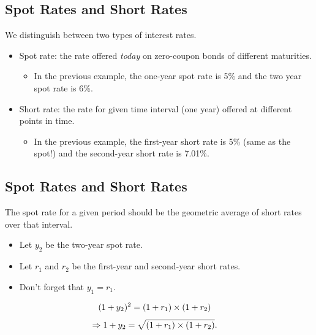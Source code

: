\documentclass[letterpaper,10pt,english]{sphinxmanual}
\begin{document}
\subsection{Spot Rates and Short Rates}
\label{termStructure:spot-rates-and-short-rates}
We distinguish between two types of interest rates.
\begin{itemize}
\item {} 
Spot rate: the rate offered \emph{today} on zero-coupon bonds of
different maturities.
\begin{itemize}
\item {} 
In the previous example, the one-year spot rate is 5\% and the two
year spot rate is 6\%.

\end{itemize}

\end{itemize}
\begin{itemize}
\item {} 
Short rate: the rate for given time interval (one year) offered at
different points in time.
\begin{itemize}
\item {} 
In the previous example, the first-year short rate is 5\% (same as
the spot!) and the second-year short rate is 7.01\%.

\end{itemize}

\end{itemize}


\subsection{Spot Rates and Short Rates}
\label{termStructure:id2}
The spot rate for a given period should be the geometric average of
short rates over that interval.
\begin{itemize}
\item {} 
Let $y_2$ be the two-year spot rate.

\end{itemize}
\begin{itemize}
\item {} 
Let $r_1$ and $r_2$ be the first-year and second-year
short rates.

\end{itemize}
\begin{itemize}
\item {} 
Don't forget that $y_1 = r_1$.

\end{itemize}
\begin{gather}
\begin{split}(1+y_2)^2 & = (1+r_1)\times(1+r_2)\end{split}\notag
\end{gather}\begin{gather}
\begin{split}\Rightarrow 1+y_2 & = \sqrt{(1+r_1) \times (1+r_2)}.\end{split}\notag
\end{gather}
\end{document}
